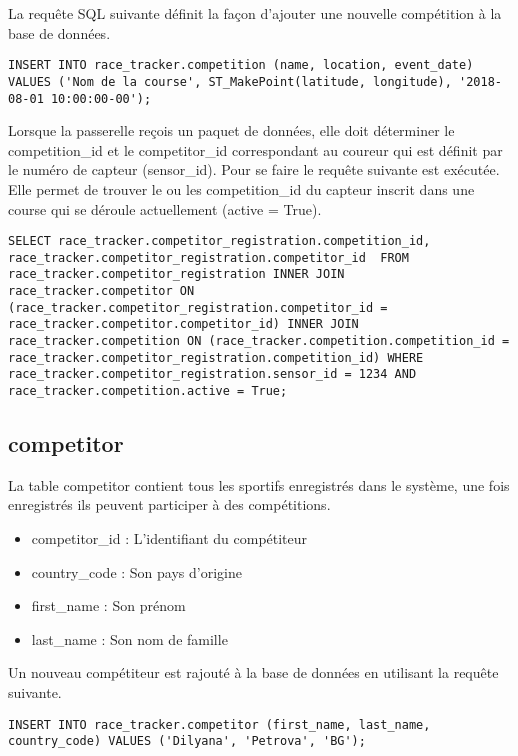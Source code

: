 La requête SQL suivante définit la façon d'ajouter une nouvelle compétition à la base de données.

\begin{lstlisting}[style=SQLStyle]
INSERT INTO race_tracker.competition (name, location, event_date) VALUES ('Nom de la course', ST_MakePoint(latitude, longitude), '2018-08-01 10:00:00-00');
\end{lstlisting}

Lorsque la passerelle reçois un paquet de données, elle doit déterminer le competition\_id et le competitor\_id correspondant au coureur qui est définit par le numéro de capteur (sensor\_id). Pour se faire le requête suivante est exécutée. Elle permet de trouver le ou les competition\_id du capteur inscrit dans une course qui se déroule actuellement (active = True).

\begin{lstlisting}[style=SQLStyle]
SELECT race_tracker.competitor_registration.competition_id, race_tracker.competitor_registration.competitor_id  FROM race_tracker.competitor_registration INNER JOIN race_tracker.competitor ON (race_tracker.competitor_registration.competitor_id = race_tracker.competitor.competitor_id) INNER JOIN race_tracker.competition ON (race_tracker.competition.competition_id = race_tracker.competitor_registration.competition_id) WHERE race_tracker.competitor_registration.sensor_id = 1234 AND race_tracker.competition.active = True;
\end{lstlisting}

\subsection{competitor}

La table competitor contient tous les sportifs enregistrés dans le système, une fois enregistrés ils peuvent participer à des compétitions.

\begin{itemize}
\item competitor\_id : L'identifiant du compétiteur
\item country\_code : Son pays d'origine
\item first\_name : Son prénom
\item last\_name : Son nom de famille
\end{itemize}

Un nouveau compétiteur est rajouté à la base de données en utilisant la requête suivante.

\begin{lstlisting}[style=SQLStyle]
INSERT INTO race_tracker.competitor (first_name, last_name, country_code) VALUES ('Dilyana', 'Petrova', 'BG');
\end{lstlisting}

